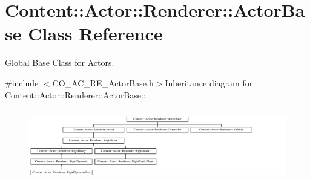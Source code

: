 \hypertarget{classContent_1_1Actor_1_1Renderer_1_1ActorBase}{
\section{Content::Actor::Renderer::ActorBase Class Reference}
\label{classContent_1_1Actor_1_1Renderer_1_1ActorBase}
}


Global Base Class for Actors.  


{\ttfamily \#include $<$CO\_\-AC\_\-RE\_\-ActorBase.h$>$}Inheritance diagram for Content::Actor::Renderer::ActorBase::\begin{figure}[H]
\begin{center}
\leavevmode
\includegraphics[height=3.19392cm]{classContent_1_1Actor_1_1Renderer_1_1ActorBase}
\end{center}
\end{figure}
